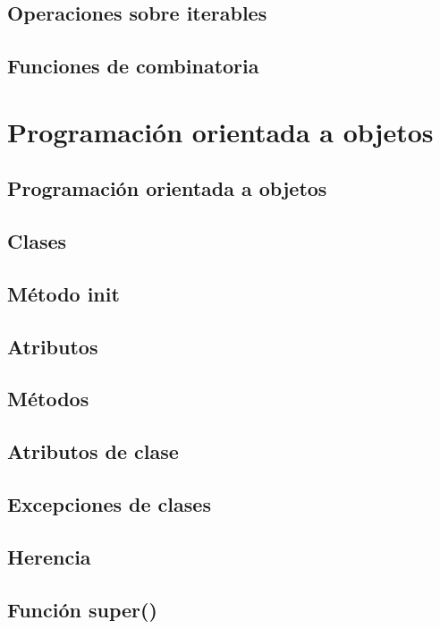 \documentclass{report}
\begin{document}
\section{Operaciones sobre iterables}

\section{Funciones de combinatoria}

\clearpage\chapter{Programación orientada a objetos}

\section{Programación orientada a objetos}

\section{Clases}

\section{Método init}

\section{Atributos}

\section{Métodos}

\section{Atributos de clase}

\section{Excepciones de clases}

\section{Herencia}

\section{Función super()}
\end{document}
